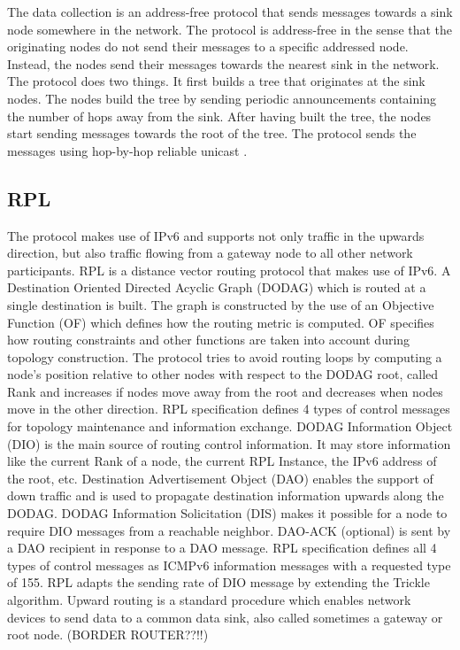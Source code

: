 The data collection is an address-free protocol that sends messages towards a sink node somewhere in the network. The protocol is address-free in the sense that the originating nodes do not send their messages to a specific addressed node. Instead, the nodes send their messages towards the nearest sink in the network. The protocol does two things. It first builds a tree that originates at the sink nodes. The nodes build the tree by sending periodic announcements containing the number of hops away from the sink. After having built the tree, the nodes start sending messages towards the root of the tree. The protocol sends the messages using hop-by-hop reliable unicast \cite{rime}. 

\subsection*{RPL}
The protocol makes use of IPv6 and supports not only traffic in the upwards direction, but also traffic flowing from a gateway node to all other network participants.
	RPL is a distance vector routing protocol that makes use of IPv6. A Destination Oriented Directed Acyclic Graph (DODAG) which is routed at a single destination is built. 
	The graph is constructed by the use of an Objective Function (OF) which defines how the routing metric is computed. OF specifies how routing constraints and other functions are taken into account during topology construction. The protocol tries to avoid routing loops by computing a node’s position relative to other nodes with respect to the DODAG root, called Rank and increases if nodes move away from the root and decreases when nodes move in the other direction. 
	RPL specification defines 4 types of control messages for topology maintenance and information exchange. DODAG Information Object (DIO) is the main source of routing control information. It may store information like the current Rank of a node, the current RPL Instance, the IPv6 address of the root, etc. Destination Advertisement Object (DAO) enables the support of down traffic and is used to propagate destination information upwards along the DODAG. DODAG Information Solicitation (DIS) makes it possible for a node to require DIO messages from a reachable neighbor. DAO-ACK (optional) is sent by a DAO recipient in response to a DAO message. RPL specification defines all 4 types of control messages as ICMPv6 information messages with a requested type of 155.
	RPL adapts the sending rate of DIO message by extending the Trickle algorithm.
	Upward routing is a standard procedure which enables network devices to send data to a common data sink, also called sometimes a gateway or root node. (BORDER ROUTER??!!)
